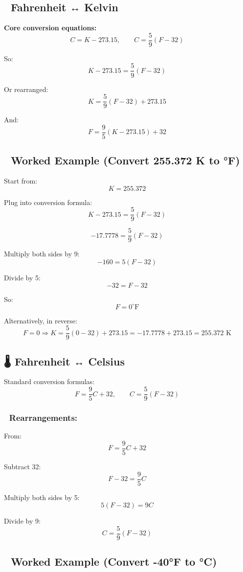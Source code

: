 \documentclass[
  letterpaper,
]{book}
\begin{document}
\subsection{🔁 Fahrenheit ↔ Kelvin}\label{fahrenheit-kelvin}

\textbf{Core conversion equations:} \[
C = K - 273.15, \qquad C = \frac{5}{9}(F - 32)
\]

So: \[
K - 273.15 = \frac{5}{9}(F - 32)
\]

Or rearranged: \[
K = \frac{5}{9}(F - 32) + 273.15
\]

And: \[
F = \frac{9}{5}(K - 273.15) + 32
\]

\subsection{🧪 Worked Example (Convert 255.372 K to
°F)}\label{worked-example-convert-255.372-k-to-f}

Start from: \[
K = 255.372
\]

Plug into conversion formula: \[
K - 273.15 = \frac{5}{9}(F - 32)
\]

\[
-17.7778 = \frac{5}{9}(F - 32)
\]

Multiply both sides by 9: \[
-160 = 5(F - 32)
\]

Divide by 5: \[
-32 = F - 32
\]

So: \[
F = 0^\circ\text{F}
\]

Alternatively, in reverse: \[
F = 0 \Rightarrow K = \frac{5}{9}(0 - 32) + 273.15 = -17.7778 + 273.15 = 255.372 \text{ K}
\]

\subsection{🌡️ Fahrenheit ↔ Celsius}\label{fahrenheit-celsius}

Standard conversion formulas: \[
F = \frac{9}{5}C + 32, \qquad C = \frac{5}{9}(F - 32)
\]

\subsubsection{🔁 Rearrangements:}\label{rearrangements}

From: \[
F = \frac{9}{5}C + 32
\]

Subtract 32: \[
F - 32 = \frac{9}{5}C
\]

Multiply both sides by 5: \[
5(F - 32) = 9C
\]

Divide by 9: \[
C = \frac{5}{9}(F - 32)
\]

\subsection{🧪 Worked Example (Convert -40°F to
°C)}\label{worked-example-convert--40f-to-c}
\end{document}
